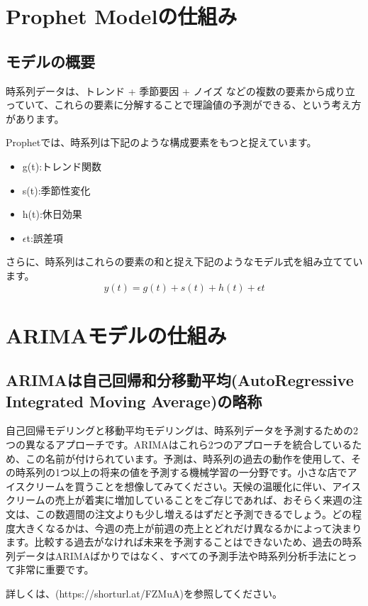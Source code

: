 \documentclass[a4paper,11pt]{jsarticle}
\begin{document}
\section{Prophet Modelの仕組み}
\subsection{モデルの概要}
\begin{frame}
  
時系列データは、トレンド + 季節要因 + ノイズ などの複数の要素から成り立っていて、これらの要素に分解することで理論値の予測ができる、という考え方があります。
    
Prophetでは、時系列は下記のような構成要素をもつと捉えています。

    \begin{itemize}
      \item g(t):トレンド関数
      \item s(t):季節性変化
      \item h(t):休日効果
      \item $ \epsilon $t:誤差項
    \end{itemize}

さらに、時系列はこれらの要素の和と捉え下記のようなモデル式を組み立てています。
\begin{equation*}
  y(t)=g(t)+s(t)+h(t)+\epsilon t
\end{equation*}

\section{ARIMAモデルの仕組み}
\subsection{ARIMAは自己回帰和分移動平均(AutoRegressive Integrated Moving Average)の略称}
自己回帰モデリングと移動平均モデリングは、時系列データを予測するための2つの異なるアプローチです。ARIMAはこれら2つのアプローチを統合しているため、この名前が付けられています。予測は、時系列の過去の動作を使用して、その時系列の1つ以上の将来の値を予測する機械学習の一分野です。小さな店でアイスクリームを買うことを想像してみてください。天候の温暖化に伴い、アイスクリームの売上が着実に増加していることをご存じであれば、おそらく来週の注文は、この数週間の注文よりも少し増えるはずだと予測できるでしょう。どの程度大きくなるかは、今週の売上が前週の売上とどれだけ異なるかによって決まります。比較する過去がなければ未来を予測することはできないため、過去の時系列データはARIMAばかりではなく、すべての予測手法や時系列分析手法にとって非常に重要です。

詳しくは、(https://shorturl.at/FZMuA)を参照してください。
\end{frame}  
\end{document}
